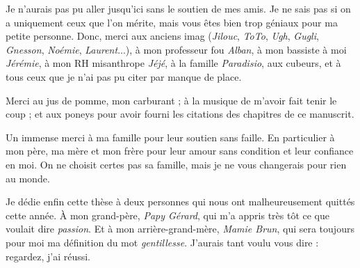 Je n'aurais pas pu aller jusqu'ici sans le soutien de mes amis. Je ne sais pas si on a uniquement ceux que l'on mérite, mais vous êtes bien trop géniaux pour ma petite personne. Donc, merci aux anciens imag (\textit{Jilouc}, \textit{ToTo}, \textit{Ugh}, \textit{Gugli}, \textit{Gnesson}, \textit{Noémie}, \textit{Laurent}...), à mon professeur fou \textit{Alban}, à mon bassiste à moi \textit{Jérémie}, à mon RH misanthrope \textit{Jéjé}, à la famille \textit{Paradisio}, aux cubeurs, et à tous ceux que je n'ai pas pu citer par manque de place.

Merci au jus de pomme, mon carburant ; à la musique de m'avoir fait tenir le coup ; et aux poneys pour avoir fourni les citations des chapitres de ce manuscrit.

Un immense merci à ma famille pour leur soutien sans faille. En particulier à mon père, ma mère et mon frère pour leur amour sans condition et leur confiance en moi. On ne choisit certes pas sa famille, mais je ne vous changerais pour rien au monde.

\quad

Je dédie enfin cette thèse à deux personnes qui nous ont malheureusement quittés cette année. À mon grand-père, \textit{Papy Gérard}, qui m'a appris très tôt ce que voulait dire \textit{passion}. Et à mon arrière-grand-mère, \textit{Mamie Brun}, qui sera toujours pour moi ma définition du mot \textit{gentillesse}. J'aurais tant voulu vous dire : regardez, j'ai réussi.


\cleardoublepage
\dominitoc
\makeatletter
\renewcommand{\tableofcontents}[1][\contentsname]{%
  \chapter*{#1}
}
\makeatother
\tableofcontents
